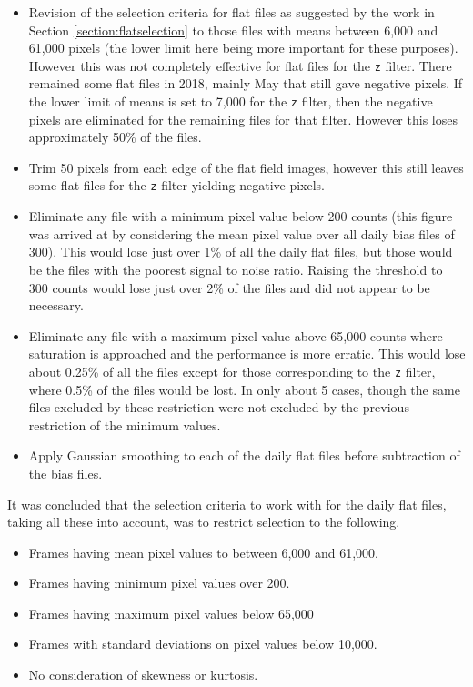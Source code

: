 \begin{itemize}
  \item Revision of the selection criteria for flat files as suggested by the
  work in Section \ref{section:flatselection} to those files with means between 6,000 and 61,000
  pixels (the lower limit here being more important for these purposes).
  However this was not completely effective for flat files for the \texttt{z}
  filter. There remained some flat files in 2018, mainly May that still gave
  negative pixels. If the lower limit of means is set to 7,000 for the
  \texttt{z} filter, then the negative pixels are eliminated for the remaining
  files for that filter. However this loses approximately 50\% of the files.
  \item Trim 50 pixels from each edge of the flat field images, however this
  still leaves some flat files for the \texttt{z} filter yielding negative
  pixels.
  \item Eliminate any file with a minimum pixel value below 200 counts (this
  figure was arrived at by considering the mean pixel value over all daily bias
  files of 300). This would lose just over 1\% of all the daily flat files, but
  those would be the files with the poorest signal to noise ratio. Raising the
  threshold to 300 counts would lose just over 2\% of the files and did not
  appear to be necessary.
  \item Eliminate any file with a maximum pixel value above 65,000 counts where
  saturation is approached and the performance is more erratic. This would lose
  about 0.25\% of all the files except for those corresponding to the \texttt{z}
  filter, where 0.5\% of the files would be lost. In only about 5 cases, though
  the same files excluded by these restriction were not excluded by the
  previous restriction of the minimum values.
  \item Apply Gaussian smoothing to each of the daily flat files before
  subtraction of the bias files.
\end{itemize}

It was concluded that the selection criteria to work with for the daily flat
files, taking all these into account, was to restrict selection to the
following.

\begin{itemize}
  \item Frames having mean pixel values to between 6,000 and 61,000.
  \item Frames having minimum pixel values over 200.
  \item Frames having maximum pixel values below 65,000
  \item Frames with standard deviations on pixel values below 10,000.
  \item No consideration of skewness or kurtosis.
\end{itemize}

